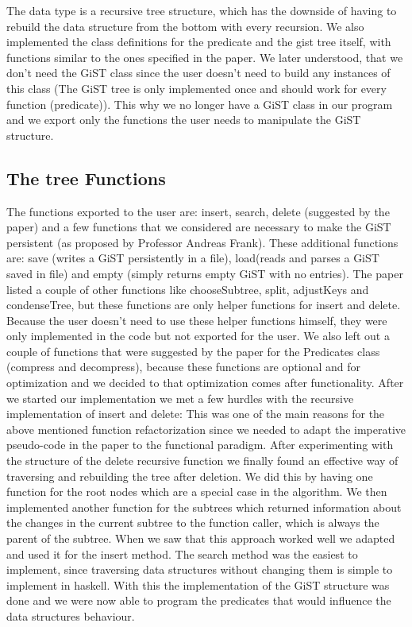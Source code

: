 \documentclass{scrartcl}
\begin{document}
 The data type is a recursive tree structure, which has the downside of having to rebuild the data structure from the bottom with every recursion.
 We also implemented the class definitions for the predicate and the gist tree itself, with functions similar to the ones specified in the paper. 
 We later understood, that we don't need the GiST class since the user doesn't need to build any instances of this class (The GiST tree is only implemented once and should work
 for every function (predicate)). This why we no longer have a GiST class in our program and we export only the functions the user needs to manipulate the GiST structure.
\subsection{The tree Functions}
The functions exported to the user are: insert, search, delete (suggested by the paper) and a few functions that we considered are necessary to make the GiST persistent (as proposed by Professor Andreas Frank).
These additional functions are: save (writes a GiST persistently in a file), load(reads and parses a GiST saved in file) and empty (simply returns empty GiST with no entries).
The paper \cite{Hellerstein95generalizedsearch} listed a couple of other functions like chooseSubtree, split, adjustKeys and condenseTree, but these functions are only helper functions for insert and delete.
Because the user doesn't need to use these helper functions himself, they were only implemented in the code but not exported for the user.
We also left out a couple of functions that were suggested by the paper for the Predicates class (compress and decompress), because these functions are optional and for optimization and
we decided to that optimization comes after functionality.
After we started our implementation we met a few hurdles with the recursive implementation of insert and delete: This was one of the main reasons for the above mentioned function refactorization since we needed
to adapt the imperative pseudo-code in the paper to the functional paradigm.
After experimenting with the structure of the delete recursive function we finally found an effective way of traversing and rebuilding the tree after deletion. We did this
by having one function for the root nodes which are a special case in the algorithm.
We then implemented another function for the subtrees which returned information about the changes in the current subtree to the function caller, which is always the parent
of the subtree. When we saw that this approach worked well we adapted and used it for the insert method. The search method was the easiest to implement, since traversing data structures without changing 
them is simple to implement in haskell. With this the implementation of the GiST structure was done and we were now able to program the predicates that would influence the data structures behaviour.
\end{document}
